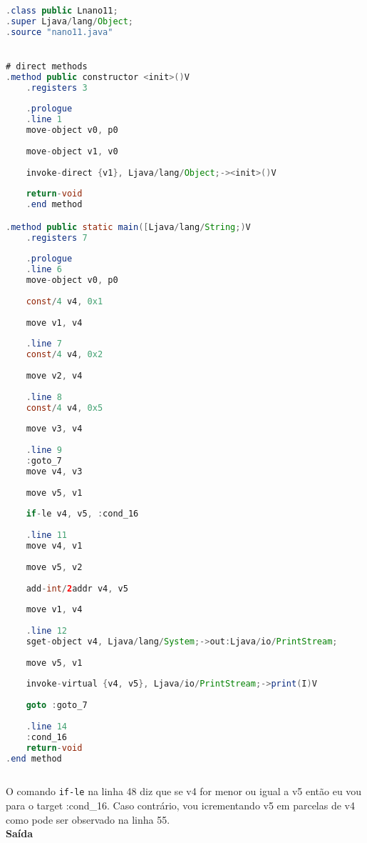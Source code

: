\documentclass[hidelinks,12pt]{article}
\begin{document}
	\begin{lstlisting}[caption=Smali resultante do .java,language=java]
.class public Lnano11;
.super Ljava/lang/Object;
.source "nano11.java"


# direct methods
.method public constructor <init>()V
	.registers 3
	
	.prologue
	.line 1
	move-object v0, p0
	
	move-object v1, v0
	
	invoke-direct {v1}, Ljava/lang/Object;-><init>()V
	
	return-void
	.end method

.method public static main([Ljava/lang/String;)V
	.registers 7
	
	.prologue
	.line 6
	move-object v0, p0
	
	const/4 v4, 0x1
	
	move v1, v4
	
	.line 7
	const/4 v4, 0x2
	
	move v2, v4
	
	.line 8
	const/4 v4, 0x5
	
	move v3, v4
	
	.line 9
	:goto_7
	move v4, v3
	
	move v5, v1
	
	if-le v4, v5, :cond_16
	
	.line 11
	move v4, v1
	
	move v5, v2
	
	add-int/2addr v4, v5
	
	move v1, v4
	
	.line 12
	sget-object v4, Ljava/lang/System;->out:Ljava/io/PrintStream;
	
	move v5, v1
	
	invoke-virtual {v4, v5}, Ljava/io/PrintStream;->print(I)V
	
	goto :goto_7
	
	.line 14
	:cond_16
	return-void
.end method	
	
	\end{lstlisting}
	
	O comando \texttt{if-le} na linha 48 diz que se v4 for menor ou igual a v5 então eu vou para o target :cond\_16. Caso contrário, vou icrementando v5 em parcelas de v4 como pode ser observado na linha 55.\\
	
	{\large{\textbf{Saída}}}
	
	\noindent{}\\	
	
\end{document}
